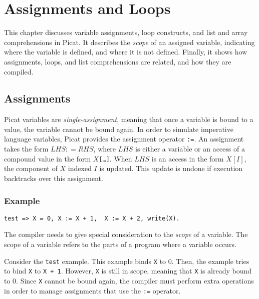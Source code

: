 \chapter{Assignments and Loops\label{chapter:loops}}
This chapter discusses variable assignments, loop constructs, and list and array comprehensions in Picat.  It describes the \emph{scope} of an assigned variable, indicating where the variable is defined, and where it is not defined.  Finally, it shows how assignments, loops, and list comprehensions are related, and how they are compiled.  

\section{Assignments}
Picat variables are \emph{single-assignment}, meaning that once a variable is bound to a value, the variable cannot be bound again.  In order to simulate imperative language variables, Picat provides the assignment operator \verb+:=+.  An assignment takes the form $LHS $$:$$=$$ RHS$, where $LHS$ is either a variable or an access of a compound value in the form \texttt{$X$[\ldots]}. When $LHS$ is an access in the form $X[I]$, the component of $X$ indexed $I$ is updated.  This update is undone if execution backtracks over this assignment.

\subsection*{Example}
\begin{verbatim}
test => X = 0, X := X + 1,  X := X + 2, write(X).
\end{verbatim}

The compiler needs to give special consideration to the \emph{scope} of a variable.  The scope of a variable refers to the parts of a program where a variable occurs.  

Consider the \texttt{test} example.  This example binds \texttt{X} to $0$.  Then, the example tries to bind \texttt{X} to \texttt{X + 1}.  However, \texttt{X} is still in scope, meaning that \texttt{X} is already bound to $0$.  Since \texttt{X} cannot be bound again, the compiler must perform extra operations in order to manage assignments that use the \texttt{:=} operator. 

